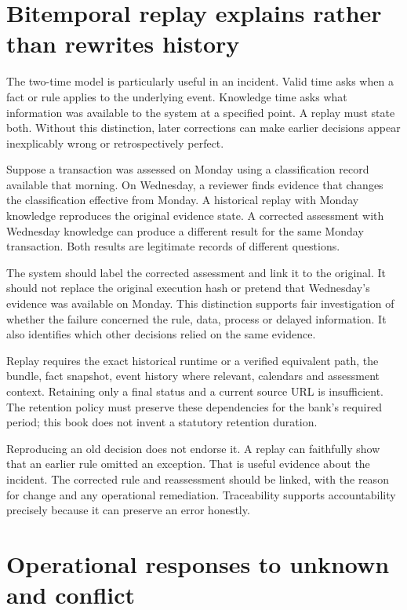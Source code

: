\documentclass[12pt,a4paper,oneside,openany]{book}
\begin{document}
\section{Bitemporal replay explains rather than rewrites history}
\label{merge:M10:06}


The two-time model is particularly useful in an incident. Valid time asks when a
fact or rule applies to the underlying event. Knowledge time asks what information
was available to the system at a specified point. A replay must state both.
Without this distinction, later corrections can make earlier decisions appear
inexplicably wrong or retrospectively perfect.

Suppose a transaction was assessed on Monday using a classification record
available that morning. On Wednesday, a reviewer finds evidence that changes the
classification effective from Monday. A historical replay with Monday knowledge
reproduces the original evidence state. A corrected assessment with Wednesday
knowledge can produce a different result for the same Monday transaction. Both
results are legitimate records of different questions.

The system should label the corrected assessment and link it to the original.
It should not replace the original execution hash or pretend that Wednesday's
evidence was available on Monday. This distinction supports fair investigation
of whether the failure concerned the rule, data, process or delayed information.
It also identifies which other decisions relied on the same evidence.

Replay requires the exact historical runtime or a verified equivalent path, the
bundle, fact snapshot, event history where relevant, calendars and assessment
context. Retaining only a final status and a current source URL is insufficient.
The retention policy must preserve these dependencies for the bank's required
period; this book does not invent a statutory retention duration.

Reproducing an old decision does not endorse it. A replay can faithfully show that
an earlier rule omitted an exception. That is useful evidence about the incident.
The corrected rule and reassessment should be linked, with the reason for change
and any operational remediation. Traceability supports accountability precisely
because it can preserve an error honestly.

\section{Operational responses to unknown and conflict}
\label{merge:M10:07}
\end{document}
